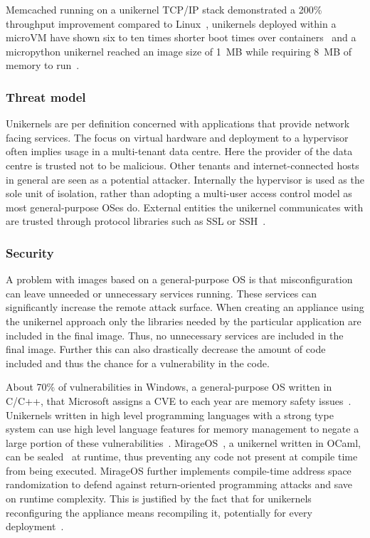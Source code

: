 \documentclass[10pt,twocolumn,a4paper]{article}
\begin{document}
      Memcached running on a unikernel TCP/IP stack
      demonstrated a 200\% throughput improvement compared to Linux~\cite{schatzberg16},
      unikernels deployed within a microVM have shown six to ten times shorter
      boot times over containers~\cite{koller17} and a micropython unikernel reached an image
      size of 1~MB while requiring 8~MB of memory to run~\cite{manco17}.

    \subsubsection{Threat model}\label{sec:thread-model}
      Unikernels are per definition concerned with applications that provide network
      facing services. 
      The focus on virtual hardware and deployment to a hypervisor
      often implies usage in a multi-tenant data centre.
      Here the provider of the data centre is trusted not to be malicious.
      Other tenants and internet-connected hosts in general are seen as 
      a potential attacker.
      Internally the hypervisor is used as the sole unit of isolation, 
      rather than adopting a multi-user access control model as most general-purpose OSes do.
      External entities the unikernel communicates with are trusted through
      protocol libraries such as SSL or SSH~\cite{madhavapeddy13}.

    \subsubsection{Security}
      A problem with images based on a general-purpose OS is that misconfiguration can
      leave unneeded or unnecessary services running. 
      These services can significantly increase the remote attack surface.
      When creating an appliance using the unikernel approach only the libraries
      needed by the particular application are included in the final image.
      Thus, no unnecessary services are included in the final image.
      Further this can also drastically decrease the amount of code included and thus the chance
      for a vulnerability in the code.
      
      About 70\% of vulnerabilities in Windows, a general-purpose OS written in C/C++,
      that Microsoft assigns a CVE to each year are memory safety issues~\cite{msrc-19-07}.
      Unikernels written in high level programming languages with a strong type system 
      can use high level language features for memory management to negate a large
      portion of these vulnerabilities~\cite{madhavapeddy13, lankes19}.
      MirageOS~\cite{madhavapeddy13}, a unikernel written in OCaml, can be sealed~\cite{hunt07} at runtime,
      thus preventing any code not present at compile time from being executed.
      MirageOS further implements compile-time address space randomization to defend against
      return-oriented programming attacks and save on runtime complexity.
      This is justified by the fact that for unikernels reconfiguring the appliance 
      means recompiling it, potentially for every deployment~\cite{madhavapeddy13}.
\end{document}
